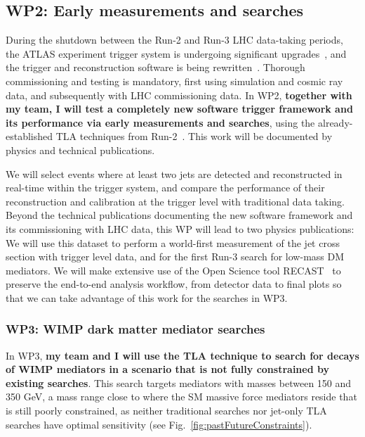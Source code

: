 \documentclass[11pt,a4paper]{article}
\begin{document}
\subsection*{WP2: Early measurements and searches}

During the shutdown between the Run-2 and Run-3 LHC data-taking periods, the ATLAS experiment trigger system is undergoing significant upgrades~\cite{Aad:2013tqj}, and the trigger and reconstruction software is being rewritten~\cite{Stewart:2016pay}. 
Thorough commissioning and testing is mandatory, first using simulation and cosmic ray data, and subsequently with LHC commissioning data. 
In WP2, \textbf{together with my team, I will test a completely new software trigger framework and its performance via early measurements and searches}, using the already-established TLA techniques from Run-2~\cite{Aaboud:2018fzt}. This work will be documented by physics and technical publications.  

We will select events where at least two jets are detected and reconstructed in real-time within the trigger system, and compare the performance of their reconstruction and calibration at the trigger level with traditional data taking. 
Beyond the technical publications documenting the new software framework and its commissioning with LHC data, this WP will lead to two physics publications:  
We will use this dataset to perform a world-first measurement of the jet cross section with trigger level data, and for the first Run-3 search for low-mass DM mediators. 
We will make extensive use of the Open Science tool RECAST~\cite{Schuy:2019awp} to preserve the end-to-end analysis workflow, from detector data to final plots so that we can take advantage of this work for the searches in WP3.  

\subsubsection*{WP3: WIMP dark matter mediator searches}

In WP3, \textbf{my team and I will use the TLA technique to search for decays of WIMP mediators in a scenario that is not fully constrained by existing searches}.
This search targets mediators with masses between 150 and 350 GeV, a mass range close to where the SM massive force mediators reside that is still poorly constrained, as neither traditional searches nor jet-only TLA searches have optimal sensitivity (see Fig.~\ref{fig:pastFutureConstraints}).  
\end{document}
